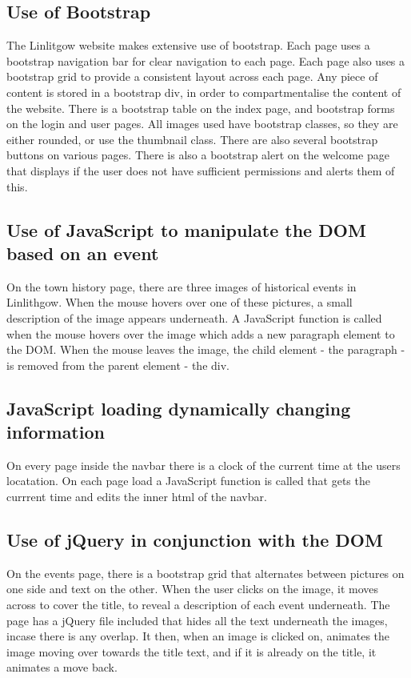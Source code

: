 \documentclass[12pt,a4paper]{article}
\begin{document}
		\subsection{Use of Bootstrap}
		The Linlitgow website makes extensive use of bootstrap. Each page uses a bootstrap navigation bar for clear navigation to each page. Each page also uses a bootstrap grid to provide a consistent layout across each page. Any piece of content is stored in a bootstrap div, in order to compartmentalise the content of the website. There is a bootstrap table on the index page, and bootstrap forms on the login and user pages. All images used have bootstrap classes, so they are either rounded, or use the thumbnail class. There are also several bootstrap buttons on various pages. There is also a bootstrap alert on the welcome page that displays if the user does not have sufficient permissions and alerts them of this.

		\subsection{Use of JavaScript to manipulate the DOM based on an event}
		On the town history page, there are three images of historical events in Linlithgow. When the mouse hovers over one of these pictures, a small description of the image appears underneath. A JavaScript function is called when the mouse hovers over the image which adds a new paragraph element to the DOM. When the mouse leaves the image, the child element - the paragraph - is removed from the parent element - the div.

		\subsection{JavaScript loading dynamically changing information}
		On every page inside the navbar there is a clock of the current time at the users locatation. On each page load a JavaScript function is called that gets the currrent time and edits the inner html of the navbar.

		\subsection{Use of jQuery in conjunction with the DOM}
		On the events page, there is a bootstrap grid that alternates between pictures on one side and text on the other. When the user clicks on the image, it moves across to cover the title, to reveal a description of each event underneath. The page has a jQuery file included that hides all the text underneath the images, incase there is any overlap. It then, when an image is clicked on, animates the image moving over towards the title text, and if it is already on the title, it animates a move back.
\end{document}
